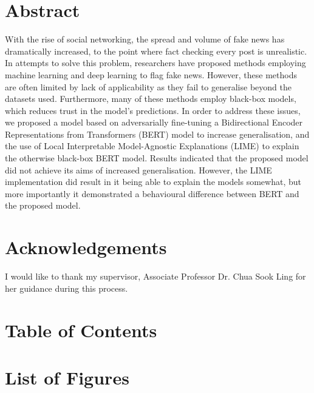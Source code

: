 \documentclass[stu,12pt,floatsintext,donotrepeattitle]{apa7}
\begin{document}
\section*{Abstract}
With the rise of social networking, the spread and volume of fake news has dramatically increased, to the point where fact checking every post is unrealistic. In attempts to solve this problem, researchers have proposed methods employing machine learning and deep learning to flag fake news. However, these methods are often limited by lack of applicability as they fail to generalise beyond the datasets used. Furthermore, many of these methods employ black-box models, which reduces trust in the model's predictions. In order to address these issues, we proposed a model based on adversarially fine-tuning a Bidirectional Encoder Representations from Transformers (BERT) model to increase generalisation, and the use of Local Interpretable Model-Agnostic Explanations (LIME) to explain the otherwise black-box BERT model. Results indicated that the proposed model did not achieve its aims of increased generalisation. However, the LIME implementation did result in it being able to explain the models somewhat, but more importantly it demonstrated a behavioural difference between BERT and the proposed model.


\clearpage
\section*{Acknowledgements}
I would like to thank my supervisor, Associate Professor Dr. Chua Sook Ling for her guidance during this process.

\clearpage
\begingroup
\titlespacing*{\section}{0pt}{0pt}{6pt}
\section*{Table of Contents}
\renewcommand{\contentsname}{}
\tableofcontents
\endgroup

\clearpage
\begingroup
\titlespacing*{\section}{0pt}{0pt}{6pt}
\section*{List of Figures}
\renewcommand{\listfigurename}{}
\listoffigures
\endgroup
\end{document}
